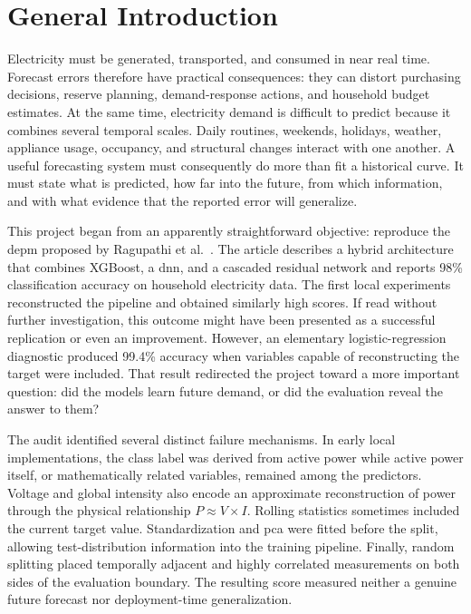 \chapter*{General Introduction}

Electricity must be generated, transported, and consumed in near real time. Forecast errors therefore have practical consequences: they can distort purchasing decisions, reserve planning, demand-response actions, and household budget estimates. At the same time, electricity demand is difficult to predict because it combines several temporal scales. Daily routines, weekends, holidays, weather, appliance usage, occupancy, and structural changes interact with one another. A useful forecasting system must consequently do more than fit a historical curve. It must state what is predicted, how far into the future, from which information, and with what evidence that the reported error will generalize.

This project began from an apparently straightforward objective: reproduce the \ac{depm} proposed by Ragupathi et al.\ \cite{ragupathi2024depm}. The article describes a hybrid architecture that combines XGBoost, a \ac{dnn}, and a cascaded residual network and reports 98\% classification accuracy on household electricity data. The first local experiments reconstructed the pipeline and obtained similarly high scores. If read without further investigation, this outcome might have been presented as a successful replication or even an improvement. However, an elementary logistic-regression diagnostic produced 99.4\% accuracy when variables capable of reconstructing the target were included. That result redirected the project toward a more important question: did the models learn future demand, or did the evaluation reveal the answer to them?

The audit identified several distinct failure mechanisms. In early local implementations, the class label was derived from active power while active power itself, or mathematically related variables, remained among the predictors. Voltage and global intensity also encode an approximate reconstruction of power through the physical relationship $P \approx V \times I$. Rolling statistics sometimes included the current target value. Standardization and \ac{pca} were fitted before the split, allowing test-distribution information into the training pipeline. Finally, random splitting placed temporally adjacent and highly correlated measurements on both sides of the evaluation boundary. The resulting score measured neither a genuine future forecast nor deployment-time generalization.

